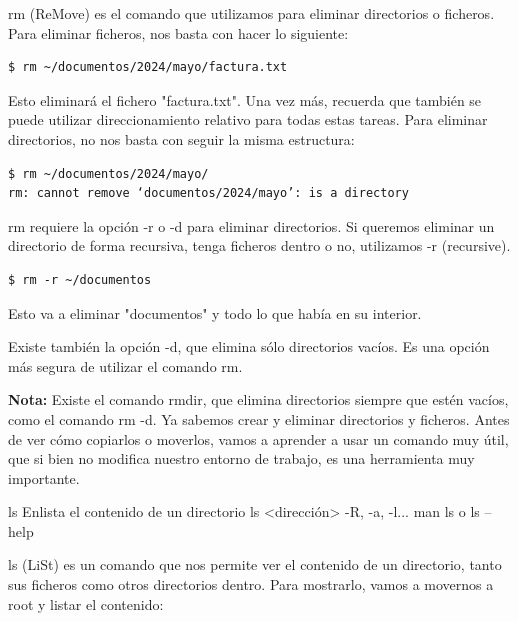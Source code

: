 rm (ReMove) es el comando que utilizamos para eliminar directorios o ficheros. Para eliminar ficheros, nos basta con hacer lo siguiente:

\begin{tcolorbox-code}
\begin{lstlisting}
$ rm ~/documentos/2024/mayo/factura.txt
\end{lstlisting}
\end{tcolorbox-code}

Esto eliminará el fichero "factura.txt". Una vez más, recuerda que también se puede utilizar direccionamiento relativo para todas estas tareas. Para eliminar directorios, no nos basta con seguir la misma estructura:

\begin{tcolorbox-code}
\begin{lstlisting}
$ rm ~/documentos/2024/mayo/
rm: cannot remove ‘documentos/2024/mayo’: is a directory
\end{lstlisting}
\end{tcolorbox-code}

rm requiere la opción -r o -d para eliminar directorios. Si queremos eliminar un directorio de forma recursiva, tenga ficheros dentro o no, utilizamos -r (recursive).

\begin{tcolorbox-code}
\begin{lstlisting}
$ rm -r ~/documentos
\end{lstlisting}
\end{tcolorbox-code}

Esto va a eliminar "documentos" y todo lo que había en su interior.

Existe también la opción -d, que elimina sólo directorios vacíos. Es una opción más segura de utilizar el comando rm.

\textbf{\textbf{Nota:}} Existe el comando rmdir, que elimina directorios siempre que estén vacíos, como el comando rm -d.
Ya sabemos crear y eliminar directorios y ficheros. Antes de ver cómo copiarlos o moverlos, vamos a aprender a usar un comando muy útil, que si bien no modifica nuestro entorno de trabajo, es una herramienta muy importante.

\begin{command-info}
{ls}
{Enlista el contenido de un directorio}
{ls <dirección>}
{-R, -a, -l...}
{man ls o ls --help}
\end{command-info}

ls (LiSt) es un comando que nos permite ver el contenido de un directorio, tanto sus ficheros como otros directorios dentro. Para mostrarlo, vamos a movernos a root y listar el contenido:


